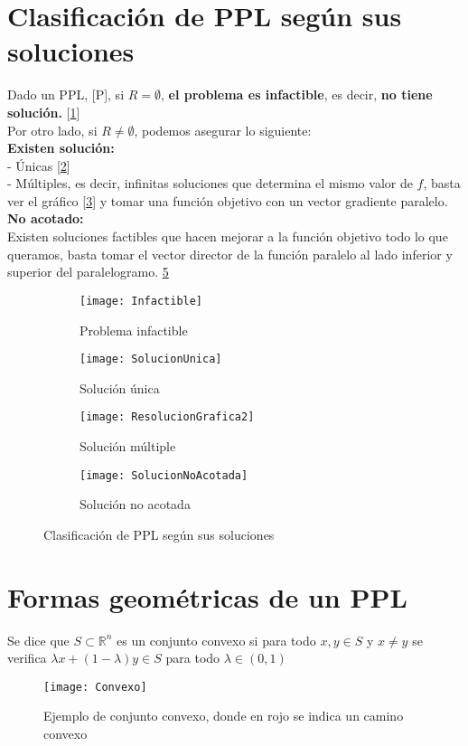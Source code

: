 \documentclass[11pt,fleqn]{book} %
\begin{document}
\section{Clasificación de PPL según sus soluciones}
Dado un PPL, [P], si $R = \emptyset$, \textbf{el problema es infactible}, es decir, \textbf{no tiene solución.} [\ref{fig:Infactible}] \\
Por otro lado, si $R \neq  \emptyset$, podemos asegurar lo siguiente: \\
\textbf{Existen solución: } \\
- Únicas [\ref{fig:Unica}] \\
- Múltiples, es decir, infinitas soluciones que determina el mismo valor de $f$, basta ver el gráfico [\ref{fig:Multiple}] y tomar una función objetivo con un vector gradiente paralelo.\\
\textbf{No acotado: } \\
Existen soluciones factibles que hacen mejorar a la función objetivo todo lo que queramos, basta tomar el vector director de la función paralelo al lado inferior y superior del paralelogramo. \ref{fig:noacotada}
\begin{figure}[ht]
  \centering
  \begin{subfigure}[b]{0.25\textwidth}
	\texttt{[image: Infactible]}
	\caption{Problema infactible}
	\label{fig:Infactible}
  \end{subfigure}
  \begin{subfigure}[b]{0.25\textwidth}
	\texttt{[image: SolucionUnica]}
	\caption{Solución única}
	\label{fig:Unica}
  \end{subfigure}
  \begin{subfigure}[b]{0.25\textwidth}
	\texttt{[image: ResolucionGrafica2]}
	\caption{Solución múltiple}
	\label{fig:Multiple}
  \end{subfigure}
  \begin{subfigure}[b]{0.25\textwidth}
	\texttt{[image: SolucionNoAcotada]}
	\caption{Solución no acotada}
	\label{fig:noacotada}
  \end{subfigure}
  \caption{Clasificación de PPL según sus soluciones}
\end{figure}

\section{Formas geométricas de un PPL}
\begin{definition}
  Se dice que $S \subset \mathbb{R}^n$ es un conjunto convexo si para todo $x, y \in S$ y $x \neq y$ se verifica $\lambda x + (1-\lambda)y \in S$ para todo $\lambda \in (0, 1)$
\end{definition}
\begin{figure}[h]
  \centering
  \texttt{[image: Convexo]}
  \caption[Ejemplo de conjunto convexo]{Ejemplo de conjunto convexo, donde en rojo se indica un camino convexo}
\end{figure}
\end{document}
